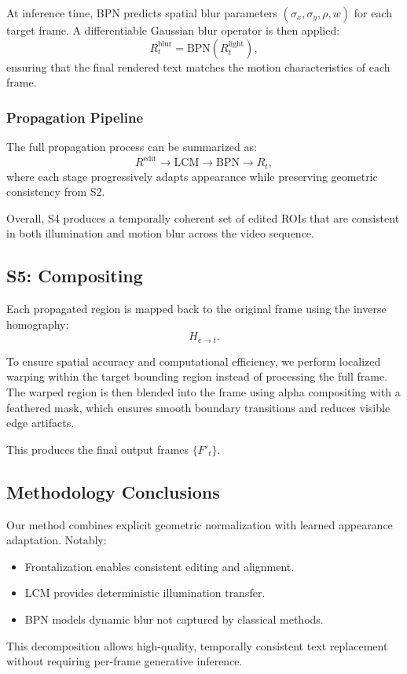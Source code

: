 At inference time, BPN predicts spatial blur parameters $(\sigma_x, \sigma_y, \rho, w)$ for each target frame. A differentiable Gaussian blur operator is then applied:
\[
R^{\text{blur}}_t = \text{BPN}(R^{\text{light}}_t),
\]
ensuring that the final rendered text matches the motion characteristics of each frame.

\subsubsection{Propagation Pipeline}

The full propagation process can be summarized as:
\[
R^{\text{edit}} \rightarrow \text{LCM} \rightarrow \text{BPN} \rightarrow R_t,
\]
where each stage progressively adapts appearance while preserving geometric consistency from S2.

Overall, S4 produces a temporally coherent set of edited ROIs that are consistent in both illumination and motion blur across the video sequence.

\subsection{S5: Compositing}

Each propagated region is mapped back to the original frame using the inverse homography:
\[
H_{c \rightarrow t}.
\]

To ensure spatial accuracy and computational efficiency, we perform localized warping within the target bounding region instead of processing the full frame. The warped region is then blended into the frame using alpha compositing with a feathered mask, which ensures smooth boundary transitions and reduces visible edge artifacts.

This produces the final output frames $\{F'_t\}$.

\subsection{Methodology Conclusions}

Our method combines explicit geometric normalization with learned appearance adaptation. Notably:
\begin{itemize}
    \item Frontalization enables consistent editing and alignment.
    \item LCM provides deterministic illumination transfer.
    \item BPN models dynamic blur not captured by classical methods.
\end{itemize}

This decomposition allows high-quality, temporally consistent text replacement without requiring per-frame generative inference.